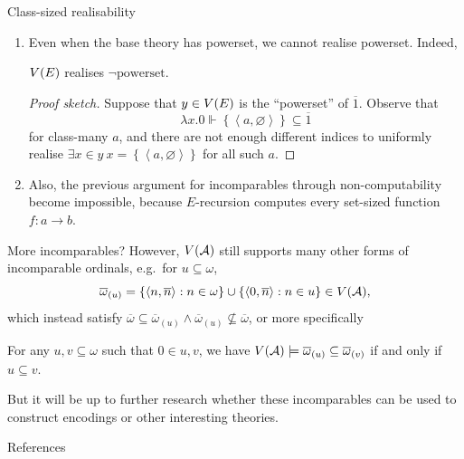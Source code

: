 \documentclass{beamer}
\newcommand\tuple[1]{\left\langle #1 \right\rangle}
\begin{document}
\begin{frame}{Class-sized realisability}
  \begin{enumerate}
    \item Even when the base theory has powerset, we cannot realise powerset. Indeed,
          \begin{theorem}
            $V\mleft(E\mright)$ realises $\neg \text{powerset}$.
          \end{theorem}

          \begin{proof}[Proof sketch]
            Suppose that $y \in V\mleft(E\mright)$ is the ``powerset'' of $\overline{1}$. Observe that
            \[\lambda x. 0 \Vdash \left\{\tuple{a, \varnothing}\right\} \subseteq \overline{1}\]
            for class-many $a$, and there are not enough different indices to uniformly realise $\exists x \in y \ x = \left\{\tuple{a, \varnothing}\right\}$ for all such $a$.
          \end{proof}

          \vspace{0.6em}

    \item Also, the previous argument for incomparables through non-computability become impossible, because $E$-recursion computes every set-sized function $f : a \rightarrow b$.
  \end{enumerate}
\end{frame}

\begin{frame}{More incomparables?}
  However, $V\mleft(\mathcal{A}\mright)$ still supports many other forms of incomparable ordinals, e.g.\ for $u \subseteq \omega$,
  \[\overline{\omega}_{\left(u\right)} = \left\{\tuple{n, \overline{n}} : n \in \omega\right\} \cup \left\{\tuple{0, \overline{n}} : n \in u\right\} \in V\mleft(\mathcal{A}\mright),\]
  which instead satisfy $\overline{\omega} \subseteq \overline{\omega}_{\left(u\right)} \land \overline{\omega}_{\left(u\right)} \not\subseteq \overline{\omega}$, or more specifically
  \begin{lemma}
    For any $u, v \subseteq \omega$ such that $0 \in u, v$, we have $V\mleft(\mathcal{A}\mright) \models \overline{\omega}_{\left(u\right)} \subseteq \overline{\omega}_{\left(v\right)}$ if and only if $u \subseteq v$.
  \end{lemma}

  \vspace{1em}

  But it will be up to further research whether these incomparables can be used to construct encodings or other interesting theories.
\end{frame}


\appendix

\begin{frame}[allowframebreaks=0.8]{References}
  \bibmain
\end{frame}
\end{document}
